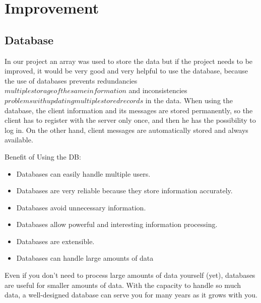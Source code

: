 \chapter{Improvement}\label{ch:improvement}


\section{Database}\label{sec:database}
In our project an array was used to store the data
but if the project needs to be improved, it would be very good and very helpful to use the database,
because the use of databases prevents redundancies \(multiple storage of the same information\) and
inconsistencies \(problems with updating multiple stored records\) in the data.
When using the database, the client information and its messages are stored permanently, so the
client has to register with the server only once, and then he has the possibility to log in.
On the other hand, client messages are automatically stored and always available.

Benefit of Using the DB:
\begin{itemize}
    \item Databases can easily handle multiple users.
    \item Databases are very reliable because they store information accurately.
    \item Databases avoid unnecessary information.
    \item Databases allow powerful and interesting information processing.
    \item Databases are extensible.
    \item Databases can handle large amounts of data
\end{itemize}
\noindent
Even if you don't need to process large amounts of data yourself (yet), databases are useful for
smaller amounts of data. With the capacity to handle so much data, a well-designed database can
serve you for many years as it grows with you.
